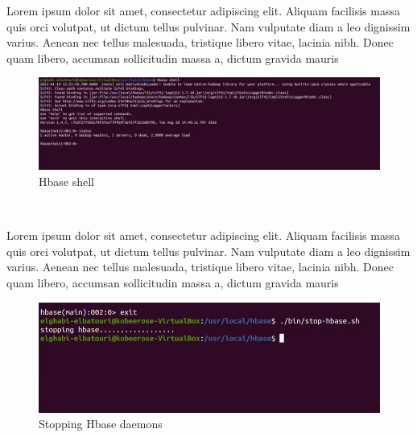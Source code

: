 \begin{spacing}{1.2}
\par Lorem ipsum dolor sit amet, consectetur adipiscing elit. Aliquam facilisis massa quis orci volutpat, ut dictum tellus pulvinar. Nam vulputate diam a leo dignissim varius. Aenean nec tellus malesuada, tristique libero vitae, lacinia nibh. Donec quam libero, accumsan sollicitudin massa a, dictum gravida mauris
\\
\begin{figure}[!htb] 
\begin{center} 
\includegraphics[width=1\linewidth]{Pictures/HBase/Configuring Hbase in Standalone & Pseudo-distributed mode/Configuring Hbase in Standalone mode/Hbase shell} 
\end{center} 
\caption{Hbase shell} 
\end{figure}  \FloatBarrier
\\

\par Lorem ipsum dolor sit amet, consectetur adipiscing elit. Aliquam facilisis massa quis orci volutpat, ut dictum tellus pulvinar. Nam vulputate diam a leo dignissim varius. Aenean nec tellus malesuada, tristique libero vitae, lacinia nibh. Donec quam libero, accumsan sollicitudin massa a, dictum gravida mauris
\\
\begin{figure}[!htb] 
\begin{center} 
\includegraphics[width=1\linewidth]{Pictures/HBase/Configuring Hbase in Standalone & Pseudo-distributed mode/Configuring Hbase in Standalone mode/Stopping Hbase daemons} 
\end{center} 
\caption{Stopping Hbase daemons} 
\end{figure}  \FloatBarrier
\\


\end{spacing}
